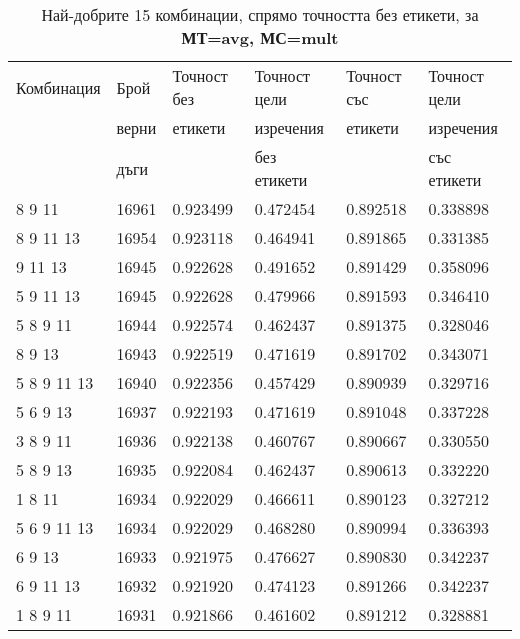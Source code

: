 \begin{table}[!htb] 
\caption{Най-добрите 15 комбинации, спрямо точността без етикети, за \textbf{МТ=avg, МС=mult}}
  \begin{tabular}{|l|l|l|l|l|l|}
\hline 
Комбинация & Брой  & Точност без  & Точност цели  & Точност със  & Точност цели  \\
 & верни	& етикети & изречения & етикети & изречения \\
 & дъги	& 	& без етикети & 	& със етикети \\
\hline 
8 9 11 &	16961 &	0.923499 &	0.472454 &	0.892518 &	0.338898\\ 
\hline 
8 9 11 13 &	16954 &	0.923118 &	0.464941 &	0.891865 &	0.331385\\ 
\hline 
9 11 13 &	16945 &	0.922628 &	0.491652 &	0.891429 &	0.358096\\ 
\hline 
5 9 11 13 &	16945 &	0.922628 &	0.479966 &	0.891593 &	0.346410\\ 
\hline 
5 8 9 11 &	16944 &	0.922574 &	0.462437 &	0.891375 &	0.328046\\ 
\hline 
8 9 13 &	16943 &	0.922519 &	0.471619 &	0.891702 &	0.343071\\ 
\hline 
5 8 9 11 13 &	16940 &	0.922356 &	0.457429 &	0.890939 &	0.329716\\ 
\hline 
5 6 9 13 &	16937 &	0.922193 &	0.471619 &	0.891048 &	0.337228\\ 
\hline 
3 8 9 11 &	16936 &	0.922138 &	0.460767 &	0.890667 &	0.330550\\ 
\hline 
5 8 9 13 &	16935 &	0.922084 &	0.462437 &	0.890613 &	0.332220\\ 
\hline 
1 8 11 &	16934 &	0.922029 &	0.466611 &	0.890123 &	0.327212\\ 
\hline 
5 6 9 11 13 &	16934 &	0.922029 &	0.468280 &	0.890994 &	0.336393\\ 
\hline 
6 9 13 &	16933 &	0.921975 &	0.476627 &	0.890830 &	0.342237\\ 
\hline 
6 9 11 13 &	16932 &	0.921920 &	0.474123 &	0.891266 &	0.342237\\ 
\hline 
1 8 9 11 &	16931 &	0.921866 &	0.461602 &	0.891212 &	0.328881\\ 
\hline 
 \end{tabular}
 \label{tab:lab_mult_avg}
 \end{table}